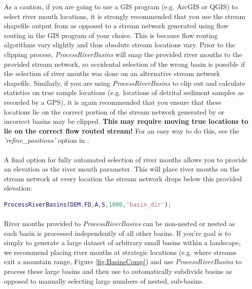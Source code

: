 \noindent
As a caution, if you are going to use a GIS program (e.g. ArcGIS or QGIS) to select river mouth locations, it is strongly recommended that you use the stream shapefile output from  as opposed to a stream network generated using flow routing in the GIS program of your choice. This is because flow routing algorithms vary slightly and thus  absolute stream locations vary. Prior to the clipping process, \textit{ProcessRiverBasins} will snap the provided river mouths to the provided stream network, so accidental selection of the wrong basin is possible if the selection of river mouths was done on an alternative stream network shapefile. Similarly, if you are using \textit{ProcessRiverBasins} to clip out and calculate statistics on true sample locations (e.g. locations of detrital sediment samples as recorded by a GPS), it is again recommended that you ensure that these locations lie on the correct portion of the stream network generated by  or incorrect basins may be clipped. \textbf{This may require moving true locations to lie on the correct flow routed stream!} For an easy way to do this, see the \textit{'refine\_positions'} option in .

\paragraph{}A final option for fully automated selection of river mouths allows you to provide an elevation as the river mouth parameter. This will place river mouths on the stream network at every location the stream network drops below this provided elevation:

\begin{lstlisting}[language=Matlab]
% To create basins with outlets above 1000 meters elevation
ProcessRiverBasins(DEM,FD,A,S,1000,'basin_dir');
\end{lstlisting}

\paragraph{}River mouths provided to \textit{ProcessRiverBasins} can be non-nested or nested as each basin is processed independently of all other basins. If you're goal is to simply to generate a large dataset of arbitrary small basins within a landscape, we recommend placing river mouths at strategic locations (e.g. where streams exit a mountain range, Figure \ref{fig:BasinsComp}) and use \textit{ProcessRiverBasins} to process these large basins and then use  to automatically subdivide basins as opposed to manually selecting large numbers of nested, sub-basins.

